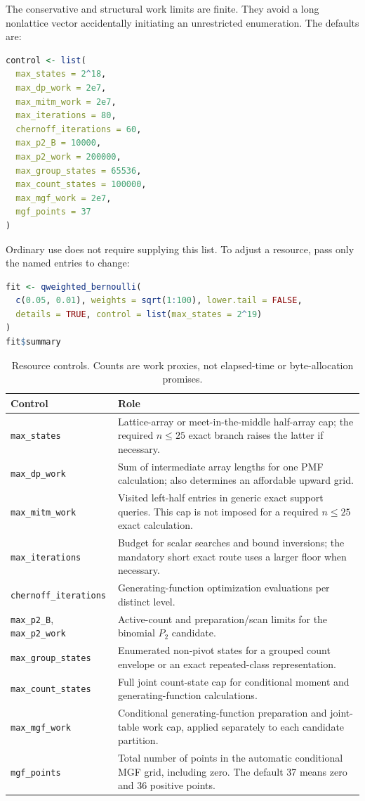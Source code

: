 \documentclass[11pt,letterpaper]{article}
\numberwithin{equation}{section}
\theoremstyle{definition}
\theoremstyle{remark}
\begin{document}
The conservative and structural work limits are finite. They avoid a long
nonlattice vector accidentally initiating an unrestricted enumeration.
The defaults are:
\begin{lstlisting}[language=R]
control <- list(
  max_states = 2^18,
  max_dp_work = 2e7,
  max_mitm_work = 2e7,
  max_iterations = 80,
  chernoff_iterations = 60,
  max_p2_B = 10000,
  max_p2_work = 200000,
  max_group_states = 65536,
  max_count_states = 100000,
  max_mgf_work = 2e7,
  mgf_points = 37
)
\end{lstlisting}
Ordinary use does not require supplying this list. To adjust a resource,
pass only the named entries to change:
\begin{lstlisting}[language=R]
fit <- qweighted_bernoulli(
  c(0.05, 0.01), weights = sqrt(1:100), lower.tail = FALSE,
  details = TRUE, control = list(max_states = 2^19)
)
fit$summary
\end{lstlisting}

\begin{table}[htbp]
\centering
\small
\caption{Resource controls. Counts are work proxies, not elapsed-time or
byte-allocation promises.}
\label{tab:controls}
\begin{tabularx}{\linewidth}{@{}lX@{}}
\toprule
Control & Role \\
\midrule
\texttt{max\_states} & Lattice-array or meet-in-the-middle half-array cap;
the required $n\le25$ exact branch raises the latter if necessary. \\
\texttt{max\_dp\_work} & Sum of intermediate array lengths for one
PMF calculation; also determines an affordable upward grid. \\
\texttt{max\_mitm\_work} & Visited left-half entries in generic exact
support queries. This cap is not imposed for a required $n\le25$ exact
calculation. \\
\texttt{max\_iterations} & Budget for scalar searches and bound inversions;
the mandatory short exact route uses a larger floor when necessary. \\
\texttt{chernoff\_iterations} & Generating-function optimization evaluations
per distinct level. \\
\texttt{max\_p2\_B}, \texttt{max\_p2\_work} & Active-count and preparation/scan
limits for the binomial $P_2$ candidate. \\
\texttt{max\_group\_states} & Enumerated non-pivot states for a grouped
count envelope or an exact repeated-class representation. \\
\texttt{max\_count\_states} & Full joint count-state cap for conditional
moment and generating-function calculations. \\
\texttt{max\_mgf\_work} & Conditional generating-function preparation and
joint-table work cap, applied separately to each candidate partition. \\
\texttt{mgf\_points} & Total number of points in the automatic conditional
MGF grid, including zero. The default 37 means zero and 36 positive points. \\
\bottomrule
\end{tabularx}
\end{table}
\end{document}
